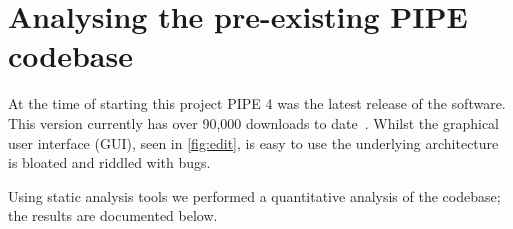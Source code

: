 \section{Analysing the pre-existing PIPE codebase}
At the time of starting this project PIPE 4 was the latest release of the software. This version currently has over 90,000 downloads to date~\cite{downloads}. Whilst the graphical user interface (GUI), seen in \cref{fig:edit}, is easy to use the underlying architecture is bloated and riddled with bugs.

Using static analysis tools we performed a quantitative analysis of the codebase; the  results are documented below.





